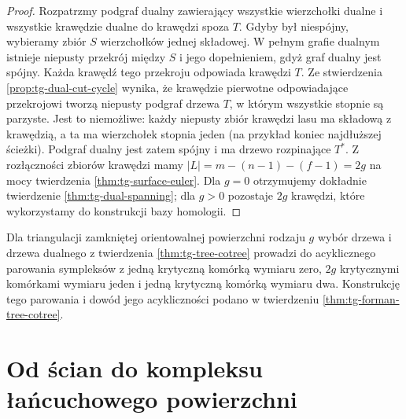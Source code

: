 \begin{proof}
Rozpatrzmy podgraf dualny zawierający wszystkie
wierzchołki dualne i wszystkie krawędzie dualne
do krawędzi spoza $T$. Gdyby był niespójny,
wybieramy zbiór $S$ wierzchołków jednej składowej.
W pełnym grafie dualnym istnieje niepusty przekrój
między $S$ i jego dopełnieniem, gdyż graf dualny jest spójny.
Każda krawędź tego przekroju odpowiada krawędzi $T$.
Ze stwierdzenia \ref{prop:tg-dual-cut-cycle} wynika,
że krawędzie pierwotne odpowiadające przekrojowi
tworzą niepusty podgraf drzewa $T$, w którym
wszystkie stopnie są parzyste. Jest to niemożliwe:
każdy niepusty zbiór krawędzi lasu ma składową
z krawędzią, a ta ma wierzchołek stopnia jeden
(na przykład koniec najdłuższej ścieżki).
Podgraf dualny jest zatem spójny i ma drzewo
rozpinające $T^*$.
Z rozłączności zbiorów krawędzi mamy
$|L|=m-(n-1)-(f-1)=2g$ na mocy
twierdzenia \ref{thm:tg-surface-euler}.
Dla $g=0$ otrzymujemy dokładnie twierdzenie
\ref{thm:tg-dual-spanning}; dla $g>0$
pozostaje $2g$ krawędzi, które wykorzystamy
do konstrukcji bazy homologii.
\end{proof}

\begin{uwaga}
Dla triangulacji zamkniętej orientowalnej powierzchni
rodzaju $g$ wybór drzewa i drzewa dualnego z twierdzenia
\ref{thm:tg-tree-cotree} prowadzi do acyklicznego parowania
sympleksów z jedną krytyczną komórką wymiaru zero,
$2g$ krytycznymi komórkami wymiaru jeden i jedną
krytyczną komórką wymiaru dwa.
Konstrukcję tego parowania i dowód jego acykliczności
podano w twierdzeniu \ref{thm:tg-forman-tree-cotree}.
\end{uwaga}

\section{Od ścian do kompleksu łańcuchowego powierzchni}
\label{sec:tg-surface-chains}

